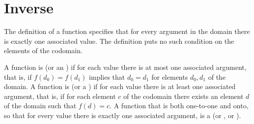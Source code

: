\documentclass{test}  %
\begin{document}
\section{Inverse}

The definition of a function specifies that for every argument in the
domain there is 
exactly one associated value.
The definition puts no such condition on the elements of the codomain.

\begin{df}
A function is  (or an ) 
if for each value there is at most
one associated argument, that is, if $f(d_0)=f(d_1)$ implies that $d_0=d_1$
for elements $d_0,d_1$ of the domain.
A function is  (or a ) 
if for each value there is at least
one associated argument, that is, if for each element $c$ of the codomain
there exists an element $d$ of the domain such that $f(d)=c$.
A function that is both one-to-one and onto, so that for every value there
is exactly one associated argument, is a 
 (or , or ).
\end{df}
\end{document}
